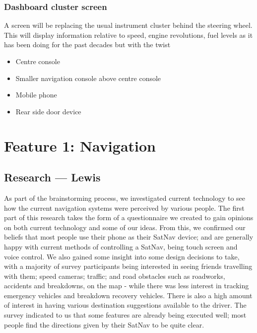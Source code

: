 \documentclass{article}
\begin{document}
\subsubsection{Dashboard cluster screen}\label{sssec:cluster-screen}
A screen will be replacing the usual instrument cluster behind the steering wheel. This will display information relative to speed, engine revolutions, fuel levels as it has been doing for the past decades but with the twist

\begin{itemize}
  \item Centre console
  \item Smaller navigation console above centre console
  \item Mobile phone
  \item Rear side door device
\end{itemize}




%
%
\section{Feature 1: Navigation}\label{sec:nav}

\subsection{Research --- Lewis}\label{ssec:nav-research}
As part of the brainstorming process, we investigated current technology to see how the current navigation systems were perceived by various people. The first part of this research takes the form of a questionnaire we created to gain opinions on both current technology and some of our ideas. From this, we confirmed our beliefs that most people use their phone as their SatNav device; and are generally happy with current methods of controlling a SatNav, being touch screen and voice control. We also gained some insight into some design decisions to take, with a majority of survey participants being interested in seeing friends travelling with them; speed cameras; traffic; and road obstacles such as roadworks, accidents and breakdowns, on the map - while there was less interest in tracking emergency vehicles and breakdown recovery vehicles. There is also a high amount of interest in having various destination suggestions available to the driver. The survey  indicated to us that some features are already being executed well; most people find the directions given by their SatNav to be quite clear.
\end{document}
